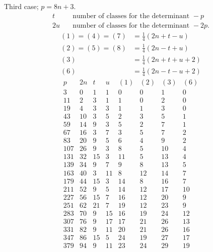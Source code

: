\clearpage
Third case; $p=8n+3$.
\[
\begin{aligned}
t&\quad\text{number of classes for the determinant }-p\\
2u&\quad\text{number of classes for the determinant }-2p.
\end{aligned}
\]
\[
\begin{aligned}
(1)=(4)=(7)&=\tfrac14(2n+t-u)\\
(2)=(5)=(8)&=\tfrac14(2n-t+u)\\
(3)&=\tfrac14(2n+t+u+2)\\
(6)&=\tfrac14(2n-t-u+2)
\end{aligned}
\]
\[
\begin{array}{r|r|r|r|r|r|r|r}
p&2n&t&u&(1)&(2)&(3)&(6)\\\hline
3&0&1&1&0&0&1&0\\
11&2&3&1&1&0&2&0\\
19&4&3&3&1&1&3&0\\
43&10&3&5&2&3&5&1\\
59&14&9&3&5&2&7&1\\
67&16&3&7&3&5&7&2\\
83&20&9&5&6&4&9&2\\
107&26&9&3&8&5&10&4\\
131&32&15&3&11&5&13&4\\
139&34&9&7&9&8&13&5\\
163&40&3&11&8&12&14&7\\
179&44&15&3&14&8&16&7\\
211&52&9&5&14&12&17&10\\
227&56&15&7&16&12&20&9\\
251&62&21&7&19&12&23&9\\
283&70&9&15&16&19&24&12\\
307&76&9&17&17&21&26&13\\
331&82&9&11&20&21&26&16\\
347&86&15&5&24&19&27&17\\
379&94&9&11&23&24&29&19
\end{array}
\]

